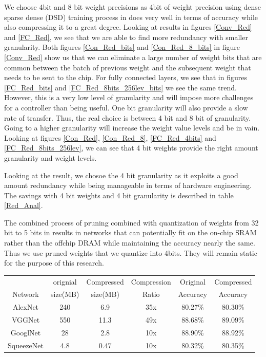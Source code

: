 \documentclass[conference]{IEEEtran}
\begin{document}
We choose 4bit and 8 bit weight precisions as 4bit of weight precision using dense sparse dense (DSD) training process in \cite{han2016dsd} does very well in terms of accuracy while also compressing it to a great degree. Looking at results in figures \ref{Conv_Red} and \ref{FC_Red}, we see that 
we are able to find more redundancy with smaller granularity. Both figures \ref{Con_Red_bits} and \ref{Con_Red_8_bits} in figure \ref{Conv_Red} show us that we can eliminate a large number of weight bits that are common between the batch of previous weight and the subsequent weight that needs to be sent to the chip. For fully connected layers, we see that in figures \ref{FC_Red_bits} and  \ref{FC_Red_8bits_256lev_bits} we see the same trend. However, this is a very low level of granularity and will impose more challenges for a controller than being useful. One bit granularity will also provide a slow rate of transfer. Thus, the real choice is between 4 bit and 8 bit of granularity. Going to a higher granularity will increase the weight value levels and be in vain. Looking at figures \ref{Con_Red}, \ref{Con_Red_8}, \ref{FC_Red_4bits} and \ref{FC_Red_8bits_256lev}, we can see that 4 bit weights provide the right amount granularity and weight levels. 

Looking at the result, we chosoe the 4 bit granularity as it exploits a good amount redundancy while being manageable in terms of hardware engineering. The savings with 4 bit weights and 4 bit granularity is described in table \ref{Red_Anal}.

\color{red}
The combined process of pruning combined with quantization of weights from 32 bit to 5 bits in \cite{han2015deep} results in networks that can potentially fit on the on-chip SRAM rather than the offchip DRAM while maintaining the accuracy nearly the same. Thus we use pruned weights that we quantize into 4bits. They will remain static for the purpose of this research.

\begin{table}[!hb]
\centering
\begin{tabular}{cccccc}
\hline
			& orignial & Compressed & Compression & Original & Compressed \\
Network    & size(MB)& size(MB)   & Ratio & Accuracy & Accuracy   \\ \hline
AlexNet    & 240           & 6.9             & 35x               & 80.27\%  & 80.30\%    \\
VGGNet     & 550           & 11.3            & 49x               & 88.68\%  & 89.09\%    \\
GooglNet   & 28            & 2.8             & 10x               & 88.90\%  & 88.92\%    \\
SqueezeNet & 4.8           & 0.47            & 10x               & 80.32\%  & 80.35\%    \\ \hline
\end{tabular}
\end{table}
\end{document}
